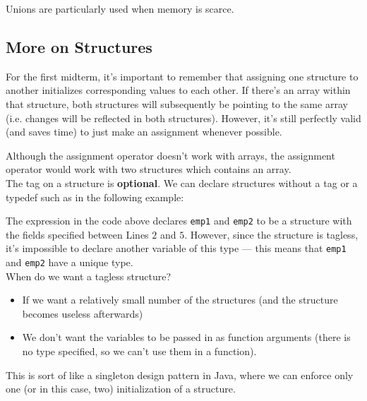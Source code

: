Unions are particularly used when memory is scarce. 


\subsection{More on Structures}

For the first midterm, it's important to remember that assigning one structure to another initializes corresponding values to each other. If there's an array within that structure, both structures will subsequently be pointing to the same array (i.e. changes will be reflected in both structures). However, it's still perfectly valid (and saves time) to just make an assignment whenever possible.  


Although the assignment operator doesn't work with arrays, the assignment operator would work with two structures which contains an array. \\


The tag on a structure is \textbf{optional}. We can declare structures without a tag or a typedef such as in the following example:

\lstset{
caption=Tagless Structure
}
\begin{center}
\label{Tagless Structure}
\end{center}

The expression in the code above declares \verb!emp1! and \verb!emp2! to be a structure with the fields specified between Lines $2$ and $5$. However, since the structure is tagless, it's impossible to declare another variable of this type --- this means that \verb!emp1! and \verb!emp2! have a unique type. \\


When do we want a tagless structure? \begin{itemize}
    \item If we want a relatively small number of the structures (and the structure becomes useless afterwards)
    \item We don't want the variables to be passed in as function arguments (there is no type specified, so we can't use them in a function). 
\end{itemize}

This is sort of like a singleton design pattern in Java, where we can enforce only one (or in this case, two) initialization of a structure. 
